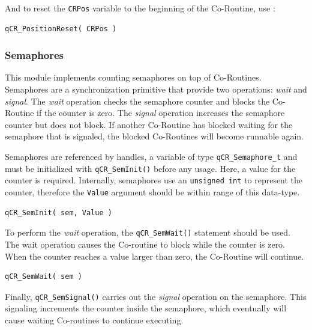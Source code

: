 \documentclass{article}
\begin{document}
And to reset the \lstinline{CRPos} variable to the beginning of the Co-Routine, use :

\begin{lstlisting}[style=CStyle]
qCR_PositionReset( CRPos )
\end{lstlisting}

\subsubsection{Semaphores}
This module implements counting semaphores on top of Co-Routines. Semaphores are a synchronization primitive that provide two operations: \textit{wait} and \textit{signal}. The \textit{wait} operation checks the semaphore counter and blocks the Co-Routine if the counter is zero. The \textit{signal} operation increases the semaphore counter but does not block. If another Co-Routine has blocked waiting for the semaphore that is signaled, the blocked Co-Routines will become runnable again.

Semaphores are referenced by handles, a variable of type \lstinline{qCR_Semaphore_t} and must be initialized with \lstinline{qCR_SemInit()}  before any usage.  Here, a value for the counter is required. Internally, semaphores use an \lstinline{unsigned int} to represent the counter, therefore the \lstinline{Value} argument should be within range of this data-type. \\

\begin{lstlisting}[style=CStyle]
qCR_SemInit( sem, Value )
\end{lstlisting}

To perform the \textit{wait} operation, the \lstinline{qCR_SemWait()}  statement should be used. The wait operation causes the Co-routine to block while the counter is zero. When the counter reaches a value larger than zero, the Co-Routine will continue. \\


\begin{lstlisting}[style=CStyle]
qCR_SemWait( sem )
\end{lstlisting}

Finally, \lstinline{qCR_SemSignal()}  carries out the \textit{signal} operation on the semaphore. This signaling increments the counter inside the semaphore, which eventually will cause waiting Co-routines to continue executing. \\
\end{document}
